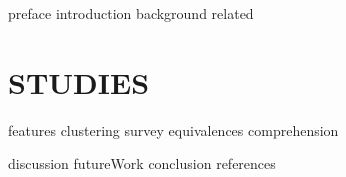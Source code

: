\documentclass[12pt]{isuthesis}
\begin{document}


{preface}
\newpage
{}
{introduction}
{background}
{related}


\chapter{STUDIES}
\label{ch4}
{features}
{clustering}
{survey}
{equivalences}
{comprehension}

{discussion}
{futureWork}
{conclusion}
{references}
\end{document}

